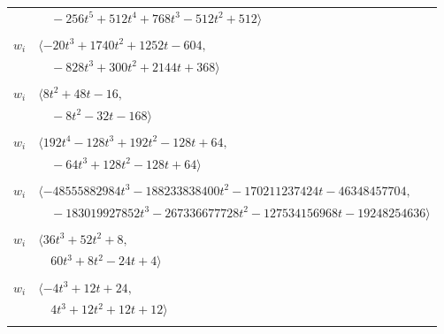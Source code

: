 \documentclass[11pt]{article}
\begin{document}
\begin{longtable}{@{}ll@{}}
 & $\quad -256t^{5}+512t^{4}+768t^{3}-512t^{2}+512\rangle$\\
\addlinespace[2pt]
\multicolumn{2}{@{}p{0.97\textwidth}@{}}{$i=72$, $D_i=32$, $\rho_{ij}$: $5{:}1, \allowbreak 8{:}1, \allowbreak 13{:}2, \allowbreak 15{:}1, \allowbreak 35{:}2, \allowbreak 42{:}2, \allowbreak 49{:}2$}\\
$w_i$ & $\langle -20t^{3}+1740t^{2}+1252t-604,$\\
 & $\quad -828t^{3}+300t^{2}+2144t+368\rangle$\\
\addlinespace[2pt]
\multicolumn{2}{@{}p{0.97\textwidth}@{}}{$i=73$, $D_i=8$, $\rho_{ij}$: $8{:}1, \allowbreak 11{:}2, \allowbreak 25{:}1, \allowbreak 42{:}2, \allowbreak 48{:}1, \allowbreak 70{:}2$}\\
$w_i$ & $\langle 8t^{2}+48t-16,$\\
 & $\quad -8t^{2}-32t-168\rangle$\\
\addlinespace[2pt]
\multicolumn{2}{@{}p{0.97\textwidth}@{}}{$i=74$, $D_i=64$, $\rho_{ij}$: $5{:}2, \allowbreak 15{:}1, \allowbreak 16{:}1, \allowbreak 28{:}2, \allowbreak 55{:}1, \allowbreak 75{:}2$}\\
$w_i$ & $\langle 192t^{4}-128t^{3}+192t^{2}-128t+64,$\\
 & $\quad -64t^{3}+128t^{2}-128t+64\rangle$\\
\addlinespace[2pt]
\multicolumn{2}{@{}p{0.97\textwidth}@{}}{$i=75$, $D_i=2147483648$, $\rho_{ij}$: $0{:}1, \allowbreak 1{:}1, \allowbreak 4{:}1, \allowbreak 7{:}2, \allowbreak 9{:}2, \allowbreak 11{:}2, \allowbreak 12{:}1, \allowbreak 18{:}2, \allowbreak 19{:}1, \allowbreak 21{:}1, \allowbreak 22{:}2, \allowbreak 23{:}2, \allowbreak 26{:}2, \allowbreak 32{:}2, \allowbreak 39{:}1, \allowbreak 40{:}2, \allowbreak 41{:}1, \allowbreak 47{:}2, \allowbreak 49{:}1, \allowbreak 57{:}2, \allowbreak 61{:}1, \allowbreak 62{:}1, \allowbreak 65{:}1, \allowbreak 69{:}1, \allowbreak 74{:}1$}\\
$w_i$ & $\langle -48555882984t^{3}-188233838400t^{2}-170211237424t-46348457704,$\\
 & $\quad -183019927852t^{3}-267336677728t^{2}-127534156968t-19248254636\rangle$\\
\addlinespace[2pt]
\multicolumn{2}{@{}p{0.97\textwidth}@{}}{$i=76$, $D_i=8$, $\rho_{ij}$: $7{:}2, \allowbreak 8{:}1, \allowbreak 35{:}1, \allowbreak 48{:}1, \allowbreak 56{:}1, \allowbreak 59{:}2$}\\
$w_i$ & $\langle 36t^{3}+52t^{2}+8,$\\
 & $\quad 60t^{3}+8t^{2}-24t+4\rangle$\\
\addlinespace[2pt]
\multicolumn{2}{@{}p{0.97\textwidth}@{}}{$i=77$, $D_i=4$, $\rho_{ij}$: $6{:}1, \allowbreak 20{:}2, \allowbreak 47{:}2, \allowbreak 48{:}1, \allowbreak 53{:}1, \allowbreak 61{:}1$}\\
$w_i$ & $\langle -4t^{3}+12t+24,$\\
 & $\quad 4t^{3}+12t^{2}+12t+12\rangle$\\
\addlinespace[2pt]
\end{longtable}
\endgroup
\end{document}
